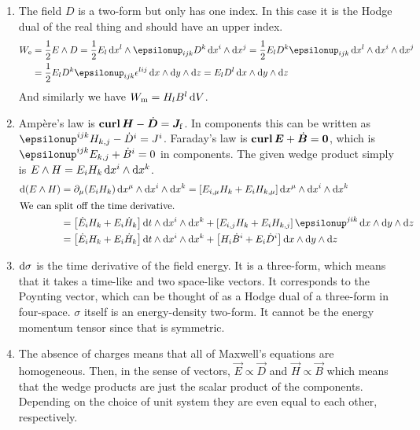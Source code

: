 \documentclass[11pt, english, fleqn, DIV=15, headinclude, BCOR=1cm]{scrartcl}
\begin{document}
\begin{enumerate}
    \item
The field $D$ is a two-form but only has one index. In this case it is the
Hodge dual of the real thing and should have an upper index.
\begin{align*}
    W_\mathrm e
    &= \frac12 E \wedge D
    = \frac 12 E_l \dif x^l \wedge \epsilonup_{ijk} D^k \dif x^i \wedge \dif
    x^j
    = \frac 12 E_l D^k \epsilonup_{ijk} \dif x^l \wedge \dif x^i \wedge \dif
    x^j \\
    &= \frac 12 E_l D^k \epsilonup_{ijk} \epsilon^{lij} \dif x \wedge \dif y \wedge \dif
    z
    = E_l D^l \dif x \wedge \dif y \wedge \dif z
\end{align*}
And similarly we have $W_\mathrm m = H_l B^l \mathop{}\!\mathrm d V$.

\item

Ampère's law is $\curl \vec H - \dot {\vec D} = \vec J_\mathrm f$. In
components this can be written as $\epsilonup^{ijk} H_{k,j} - \dot D^i = J^i$.
Faraday's law is $\curl \vec E + \dot{\vec B} = \vec 0$, which is
$\epsilonup^{ijk} E_{k,j} + \dot B^i = 0$ in components. The given wedge
product simply is $E \wedge H = E_i H_k \mathop{}\!\mathrm d x^i \wedge \mathop{}\!\mathrm d x^k$.
\begin{align*}
    \dif(E \wedge H)
    &= \partial_\mu (E_i H_k) \dif x^\mu \wedge \dif x^i \wedge \dif x^k
    = \sbr{E_{i,\mu} H_k + E_i H_{k,\mu}} \dif x^\mu \wedge \dif x^i \wedge
    \dif x^k \\
    \intertext{%
        We can split off the time derivative.
    }
    &= \sbr{\dot E_i H_k + E_i \dot H_k} \dif t \wedge \dif x^i \wedge \dif x^k
    + \sbr{E_{i,j} H_k + E_i H_{k,j}} \epsilonup^{jik} \dif x \wedge \dif y
    \wedge \dif z \\
    &= \sbr{\dot E_i H_k + E_i \dot H_k} \dif t \wedge \dif x^i \wedge \dif x^k
    + \sbr{H_i \dot B^i + E_i \dot D^i} \dif x \wedge \dif y \wedge \dif z
\end{align*}

\item
    $\mathop{}\!\mathrm d \sigma$ is the time derivative of the field energy. It is a
    three-form, which means that it takes a time-like and two space-like
    vectors. It corresponds to the Poynting vector, which can be thought of as
    a Hodge dual of a three-form in four-space. $\sigma$ itself is an
    energy-density two-form. It cannot be the energy momentum tensor since that
    is symmetric.

\item
    The absence of charges means that all of Maxwell's equations are
    homogeneous. Then, in the sense of vectors, $\vec E \propto \vec D$ and
    $\vec H \propto \vec B$ which means that the wedge products are just the
    scalar product of the components. Depending on the choice of unit system
    they are even equal to each other, respectively.


\end{enumerate}
\end{document}
